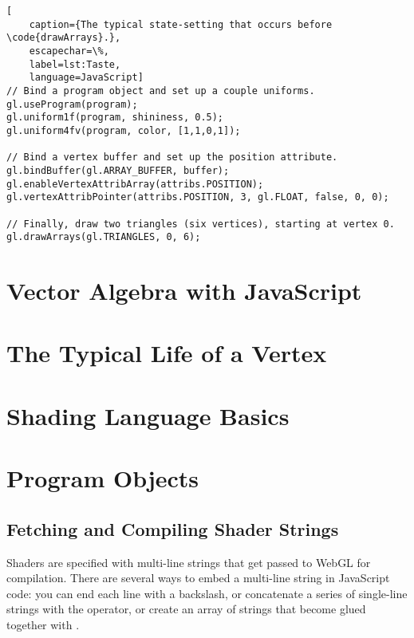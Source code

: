 \begin{lstlisting}[
    caption={The typical state-setting that occurs before \code{drawArrays}.},
    escapechar=\%,
    label=lst:Taste,
    language=JavaScript]
// Bind a program object and set up a couple uniforms.
gl.useProgram(program);
gl.uniform1f(program, shininess, 0.5);
gl.uniform4fv(program, color, [1,1,0,1]);

// Bind a vertex buffer and set up the position attribute.
gl.bindBuffer(gl.ARRAY_BUFFER, buffer);
gl.enableVertexAttribArray(attribs.POSITION);
gl.vertexAttribPointer(attribs.POSITION, 3, gl.FLOAT, false, 0, 0);

// Finally, draw two triangles (six vertices), starting at vertex 0.
gl.drawArrays(gl.TRIANGLES, 0, 6);
\end{lstlisting}

\section{Vector Algebra with JavaScript}

\section{The Typical Life of a Vertex}

\section{Shading Language Basics}

\section{Program Objects}

\subsection{Fetching and Compiling Shader Strings}

Shaders are specified with multi-line strings that get passed to WebGL for compilation.  There are several ways to embed a multi-line string in JavaScript code: you can end each line with a backslash, or concatenate a series of single-line strings with the \code{+} operator, or create an array of strings that become glued together with .


